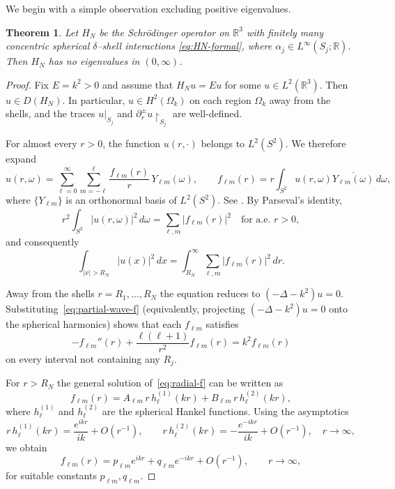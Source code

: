 \documentclass[a4paper,11pt]{article}
\numberwithin{equation}{section}
\newtheorem{thm}{Theorem}
\theoremstyle{definition}
\theoremstyle{remark}
\begin{document}
We begin with a simple observation excluding positive eigenvalues.
%
\begin{thm}\label{thm:no-embedded}
Let $H_N$ be the Schr\"odinger operator on $\mathbb R^3$ with finitely many
concentric spherical $\delta$--shell interactions \eqref{eq:HN-formal}, where
$\alpha_j\in L^\infty(S_j;\mathbb R)$.
Then $H_N$ has no eigenvalues in $(0,\infty)$.
\end{thm}
%
\begin{proof}
Fix $E=k^2>0$ and assume that $H_Nu=Eu$ for some $u\in L^2(\mathbb R^3)$.
Then $u\in D(H_N)$.
In particular, $u\in H^2(\Omega_k)$ on each region $\Omega_k$ away from the shells,
and the traces $u|_{S_j}$ and $\partial_r^\pm u\upharpoonright_{S_j}$ are well-defined.

For almost every $r>0$, the function $u(r,\cdot)$ belongs to $L^2(S^2)$.
We therefore expand
\begin{equation}\label{eq:partial-wave-f}
u(r,\omega)=\sum_{\ell=0}^\infty\sum_{m=-\ell}^{\ell}
\frac{f_{\ell m}(r)}{r}\,Y_{\ell m}(\omega),
\qquad
f_{\ell m}(r)
=
r\int_{S^2}u(r,\omega)\overline{Y_{\ell m}(\omega)}\,d\omega,
\end{equation}
where $\{Y_{\ell m}\}$ is an orthonormal basis of $L^2(S^2)$.
See \cite{AbramowitzStegun}.
By Parseval's identity,
\begin{equation}\label{eq:parseval}
r^2\int_{S^2}|u(r,\omega)|^2\,d\omega
=\sum_{\ell,m}|f_{\ell m}(r)|^2
\quad\text{for a.e.\ }r>0,
\end{equation}
and consequently
\begin{equation}\label{eq:L2-outside}
\int_{|x|>R_N}|u(x)|^2\,dx
=\int_{R_N}^\infty\sum_{\ell,m}|f_{\ell m}(r)|^2\,dr.
\end{equation}

Away from the shells $r=R_1,\dots,R_N$ the equation reduces to
$(-\Delta-k^2)u=0$.
Substituting~\eqref{eq:partial-wave-f}
(equivalently, projecting $(-\Delta-k^2)u=0$ onto the spherical harmonics)
shows that each $f_{\ell m}$ satisfies
\begin{equation}\label{eq:radial-f}
-f_{\ell m}''(r)+\frac{\ell(\ell+1)}{r^2}f_{\ell m}(r)=k^2 f_{\ell m}(r)
\end{equation}
on every interval not containing any $R_j$.

For $r>R_N$ the general solution of~\eqref{eq:radial-f} can be written as
\begin{equation}\label{eq:f-hankel}
f_{\ell m}(r)=A_{\ell m}\,r\,h^{(1)}_{\ell}(kr)
+B_{\ell m}\,r\,h^{(2)}_{\ell}(kr),
\end{equation}
where $h^{(1)}_{\ell}$ and $h^{(2)}_{\ell}$ are the spherical Hankel functions.
Using the asymptotics
\[
r\,h^{(1)}_{\ell}(kr)=\frac{e^{ikr}}{ik}+O(r^{-1}),
\qquad
r\,h^{(2)}_{\ell}(kr)=-\frac{e^{-ikr}}{ik}+O(r^{-1}),
\quad r\to\infty,
\]
we obtain
\begin{equation}\label{eq:f-asymp}
f_{\ell m}(r)=p_{\ell m}e^{ikr}
+q_{\ell m}e^{-ikr}+O(r^{-1}),
\qquad r\to\infty,
\end{equation}
for suitable constants $p_{\ell m},q_{\ell m}$.


\end{proof}
\end{document}
